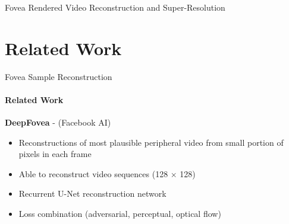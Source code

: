 \documentclass[
	ngerman,
	aspectratio=169,
	color={accentcolor=3d},
	logo=false,
	colorframetitle=true,
	]{tudabeamer}
\begin{document}
\begin{frame}{Fovea Rendered Video Reconstruction and Super-Resolution}
{\begin{center}
\end{center}}
\end{frame}


\section{Related Work}

\begin{frame}{Fovea Sample Reconstruction}
\framesubtitle{Related Work}
\textbf{DeepFovea} - \citet{deepfovea} (Facebook AI)
\begin{itemize}
    \item Reconstructions of most plausible peripheral video from small portion of pixels in each frame
    \item Able to reconstruct video sequences (128 $\times$ 128)
    \item Recurrent U-Net reconstruction network
    \item Loss combination (adversarial, perceptual, optical flow)
\end{itemize}
\end{frame}
\end{document}
